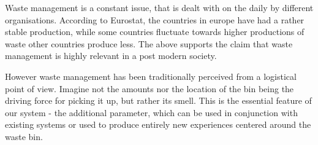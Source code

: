 Waste management is a constant issue, that is dealt with on the daily by different organisations.
According to Eurostat, the countries in europe have had a rather stable production, while some countries fluctuate towards higher productions of waste other countries produce less.
The above supports the claim that waste management is highly relevant in a post modern society.

However waste management has been traditionally perceived from a logistical point of view.
Imagine not the amounts nor the location of the bin being the driving force for picking it up, but rather its smell.
This is the essential feature of our system - the additional parameter, which can be used in conjunction with existing systems or used to produce entirely new experiences centered around the waste bin.